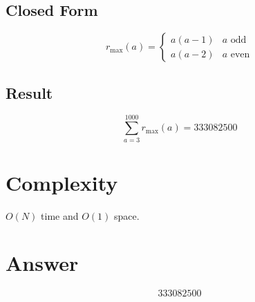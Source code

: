 \documentclass[12pt]{article}
\begin{document}
\subsection{Closed Form}
\[
r_{\max}(a) = \begin{cases}
a(a-1) & a \text{ odd} \\
a(a-2) & a \text{ even}
\end{cases}
\]

\subsection{Result}
\[
\sum_{a=3}^{1000} r_{\max}(a) = \boxed{333082500}
\]

\section{Complexity}
$O(N)$ time and $O(1)$ space.

\section{Answer}

\[
\boxed{333082500}
\]
\end{document}
